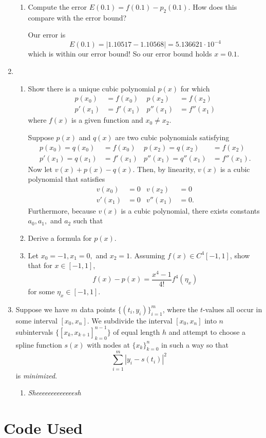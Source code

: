 \documentclass[a4paper,12pt]{article}
\newcommand{\abs}[1]{\left| #1 \right|}
\begin{document}
\begin{enumerate}[label = \arabic*.]
\begin{enumerate}[label = (\roman*)]
			\item Compute the error $ E(0.1) = f(0.1) - p_2(0.1) $. How does this compare with the error bound?
			
			Our error is
			\[
				E(0.1) = \abs{1.10517 - 1.10568} = 5.136621 \cdot 10^{-4}
			\]
			which is within our error bound! So our error bound holds $ x = 0.1 $.
		\end{enumerate}
	
	\newpage
	\item \
		\begin{enumerate}[label = (\roman*)]
			\item Show there is a unique cubic polynomial $ p(x) $ for which 
			\begin{align*}
				p(x_0)  &= f(x_0) & p(x_2)   &= f(x_2) \\
				p'(x_1) &= f'(x_1) & p''(x_1) &= f''(x_1)
			\end{align*}
			where $ f(x) $ is a given function and $ x_0 \neq x_2 $.
			
			Suppose $ p(x) $ and $ q(x) $ are two cubic polynomials satisfying
			\begin{align*}
				p(x_0) = q(x_0)  &= f(x_0) & p(x_2) = q(x_2)    &= f(x_2) \\
				p'(x_1) = q(x_1) &= f'(x_1) & p''(x_1) = q''(x_1) &= f''(x_1).
			\end{align*}
			Now let $ v(x) + p(x) - q(x) $. Then, by linearity, $ v(x) $ is a cubic polynomial that satisfies
			\begin{align*}
				v(x_0)  &= 0 & v(x_2)  &= 0 \\
				v'(x_1) &= 0 & v''(x_1) &= 0.
			\end{align*}
			Furthermore, because $ v(x) $ is a cubic polynomial, there exists constants $ a_0, a_1, $ and $ a_2 $ such that
			
			\item Derive a formula for $ p(x) $.
			
			\item Let $ x_0 = -1, x_1 = 0, $ and $ x_2 = 1 $. Assuming $ f(x) \in C^4[-1,1] $, show that for $ x \in [-1,1] $,
			\[
				f(x) - p(x) = \frac{x^4 - 1}{4!}f^4(\eta_x)
			\]
			for some $ \eta_x \in [-1,1] $.
		\end{enumerate}
	
	\item Suppose we have $ m $ data points $ \{(t_i, y_i)\}_{i = 1}^m $, where the $ t $-values all occur in some interval $ [x_0, x_n] $. We subdivide the interval $ [x_0, x_n] $ into $ n $ subintervals $ \{[x_k, x_{k + 1}]_{k = 0}^{n - 1}\} $ of equal length $ h $ and attempt to choose a spline function $ s(x) $ with nodes at $ \{x_k\}_{k = 0}^n $ in such a way so that
	\[
		\sum_{i = 1}^{m} \abs{y_i - s(t_i)}^2
	\]
	is \emph{minimized}.
		\begin{enumerate}[label = (\roman*)]
			\item \emph{Sheeeeeeeeeeeeesh}
		\end{enumerate}
\end{enumerate}

\section*{Code Used}
\end{document}

